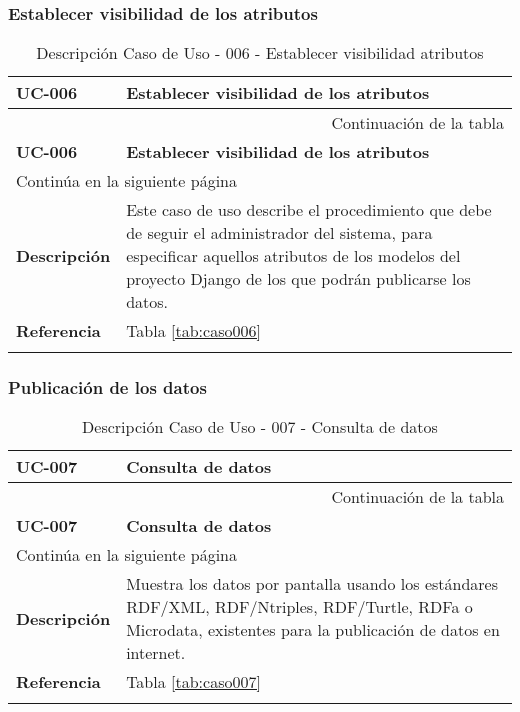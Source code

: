 \subsubsection{Establecer visibilidad de los atributos}

\begin{center}
\begin{longtable}{||p{3.4cm}|p{12cm}||}
 \hline \hline \bf UC-006 &  \bf Establecer visibilidad de los atributos\\
\hline
\endfirsthead
\hline \multicolumn{2}{|r|}{{Continuación de la tabla}} \\ \hline
 \hline \bf UC-006 &  \bf Establecer visibilidad de los atributos \\
\hline
\endhead
\hline \multicolumn{2}{|l|}{{Continúa en la siguiente página}} \\ \hline
\endfoot
\endlastfoot
 \hline \bf Descripción & Este caso de uso describe el procedimiento que debe
             de seguir el administrador del sistema, para especificar aquellos
             atributos de los modelos del proyecto Django de los que podrán
             publicarse los datos.\\
 \hline \bf Referencia & Tabla \ref{tab:caso006}\\
\hline
\hline
\caption{\label{tab:caso006-red} Descripción Caso de Uso - 006 - Establecer visibilidad atributos} 
\end{longtable}
\end{center}


\subsubsection{Publicación de los datos}

\begin{center}
\begin{longtable}{||p{3.4cm}|p{12cm}||}
 \hline \hline \bf UC-007 &  \bf Consulta de datos \\
\hline
\endfirsthead
\hline \multicolumn{2}{|r|}{{Continuación de la tabla}} \\ \hline
 \hline \bf UC-007 &  \bf Consulta de datos \\
\hline
\endhead
\hline \multicolumn{2}{|l|}{{Continúa en la siguiente página}} \\ \hline
\endfoot
\endlastfoot
 \hline \bf Descripción & Muestra los datos por pantalla usando los estándares
    RDF/XML, RDF/Ntriples, RDF/Turtle, RDFa o Microdata, existentes para la
    publicación de datos en internet.\\
 \hline \bf Referencia & Tabla \ref{tab:caso007}\\
\hline
\hline
\caption{\label{tab:caso007-red} Descripción Caso de Uso - 007 - Consulta de datos} 
\end{longtable}
\end{center}


